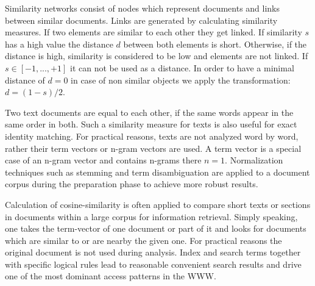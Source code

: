 \documentclass[a4paper,10pt]{scrbook}
\begin{document}
Similarity networks consist of nodes which represent documents and links between similar documents. Links are generated by calculating similarity measures. If two elements are similar to each other they get linked. If similarity $s$ has a high value the distance $d$ between both elements is short. Otherwise, if the distance is high, similarity is considered to be low and elements are not linked. If $s \in [-1 , ..., +1]$ it can not be used as a distance. In order to have a minimal distance of $d=0$ in case of non similar objects we apply the transformation: $d=(1-s)/2$.

Two text documents are equal to each other, if the same words appear in the same order in both. Such a similarity measure for texts is also useful for exact identity matching. For practical reasons, texts are not analyzed word by word, rather their term vectors or n-gram vectors are used. A term vector is a special case of an n-gram vector and contains n-grams there $n=1$. Normalization techniques such as stemming and term disambiguation are applied to a document corpus during the preparation phase to achieve more robust results.    





Calculation of cosine-similarity is often applied to compare short texts or sections in documents within a large corpus for information retrieval. Simply speaking, one takes the term-vector of one document or part of it and looks for documents which are similar to or are nearby the given one. For practical reasons the original document is not used during analysis. Index and search terms together with specific logical rules lead to reasonable convenient search results and drive one of the most dominant access patterns in the WWW. 
\end{document}
